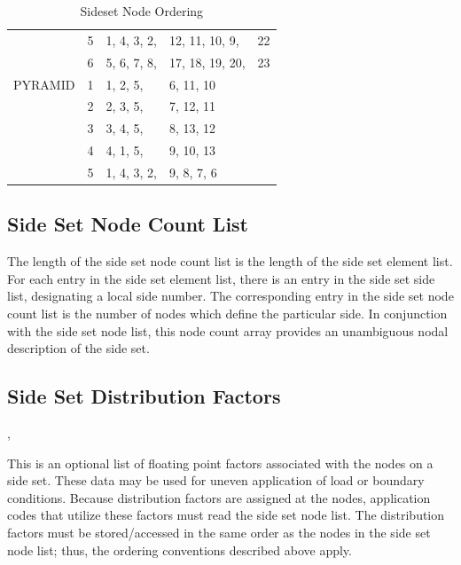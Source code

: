 \begin{table}
\begin{center}
\begin{tabular}{l|c|lll}
       & 5 & 1, 4, 3, 2, & 12, 11, 10, 9, & 22 \\
       & 6 & 5, 6, 7, 8, & 17, 18, 19, 20, & 23 \\ \hline
PYRAMID&1 & 1, 2, 5, & 6, 11, 10 \\
       & 2 & 2, 3, 5, & 7, 12, 11 \\
       & 3 & 3, 4, 5, & 8, 13, 12 \\
       & 4 & 4, 1, 5, & 9, 10, 13 \\
       & 5 & 1, 4, 3, 2, & 9, 8, 7, 6
\end{tabular}
\caption{Sideset Node Ordering}\label{t:sset_node_ordering}
\end{center}
\end{table}

\subsection{Side Set Node Count List}


\begin{spacing}{1.5}
\api {}
\end{spacing}

The length of the side set node count list is the length of the side
set element list. For each entry in the side set element list, there
is an entry in the side set side list, designating a local side
number. The corresponding entry in the side set node count list is the
number of nodes which define the particular side. In conjunction with
the side set node list, this node count array provides an unambiguous
nodal description of the side set.

\subsection{Side Set Distribution Factors}


\begin{spacing}{1.5}
\api {}, 
\end{spacing}

This is an optional list of floating point factors associated with the
nodes on a side set. These data may be used for uneven application of
load or boundary conditions. Because distribution factors are assigned
at the nodes, application codes that utilize these factors must read
the side set node list. The distribution factors must be
stored/accessed in the same order as the nodes in the side set node
list; thus, the ordering conventions described above apply.


